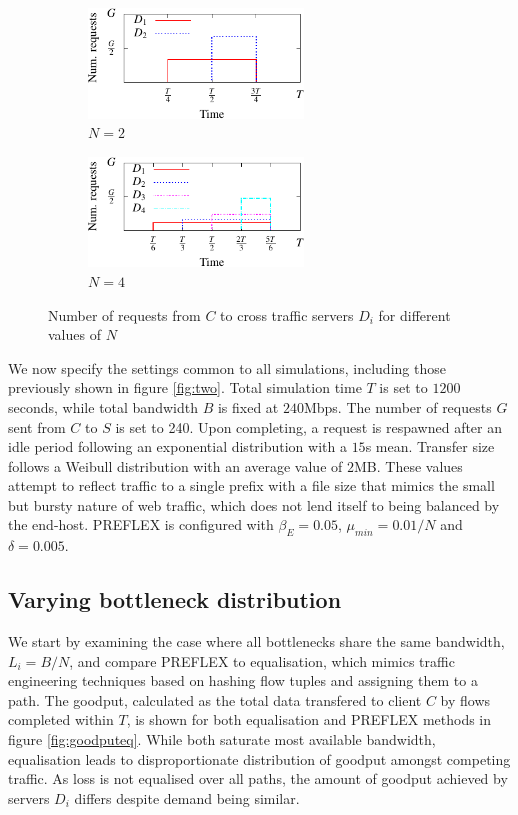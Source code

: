 \begin{figure}
    \begin{subfigure}[b]{.5\linewidth}
        \centering
        \includegraphics[width=2.25in]{figures/cate/dummy2-crop.pdf}
        \caption{$N=2$}\label{fig:1a}
    \end{subfigure}%
    \begin{subfigure}[b]{.5\linewidth}
        \centering
        \includegraphics[width=2.25in]{figures/cate/dummy4-crop.pdf}
        \caption{$N=4$}\label{fig:1b}
    \end{subfigure}
    \caption{Number of requests from $C$ to cross traffic servers $D_i$ for different values of $N$}
    \label{fig:demand}
\end{figure}

We now specify the settings common to all simulations, including those previously shown in figure \ref{fig:two}. 
Total simulation time $T$ is set to $1200$ seconds, while total bandwidth $B$ is fixed at $240$Mbps. 
The number of requests $G$ sent from $C$ to $S$ is set to 240. 
Upon completing, a request is respawned after an idle period following an exponential distribution with a $15$s mean. 
Transfer size follows a Weibull distribution with an average value of $2$MB. 
These values attempt to reflect traffic to a single prefix with a file size that mimics the small but bursty nature of web traffic, which does not lend itself to being balanced by the end-host. 
\ac{PREFLEX} is configured with $\beta_E = 0.05$, $\mu_{min}=0.01/N$ and $\delta=0.005$.

\subsection{Varying bottleneck distribution}

We start by examining the case where all bottlenecks share the same bandwidth, $L_i=B/N$, and compare \ac{PREFLEX} to equalisation, which mimics traffic engineering techniques based on hashing flow tuples and assigning them to a path. 
The goodput, calculated as the total data transfered to client $C$ by flows completed within $T$, is shown for both equalisation and \ac{PREFLEX} methods in figure \ref{fig:goodputeq}. 
While both saturate most available bandwidth, equalisation leads to disproportionate distribution of goodput amongst competing traffic. 
As loss is not equalised over all paths, the amount of goodput achieved by servers $D_i$ differs despite demand being similar.


